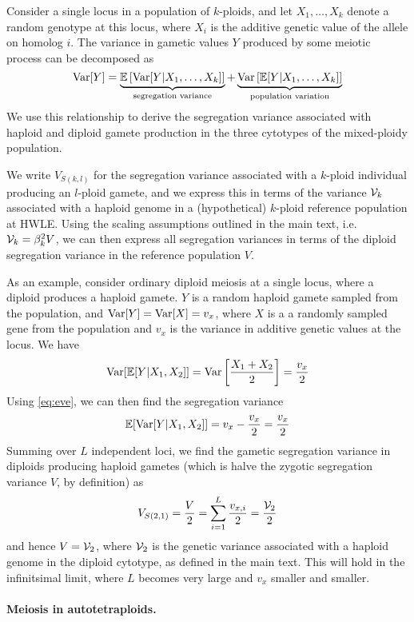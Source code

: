\documentclass[11pt,a4paper]{article}
\begin{document}
Consider a single locus in a population of $k$-ploids, and let $X_1,\dots,X_k$
denote a random genotype at this locus, where $X_i$ is the additive genetic
value of the allele on homolog $i$.
The variance in gametic values $Y$ produced by some meiotic process can be
decomposed as 
\begin{equation}
  \mathrm{Var}[Y] = \underbrace{\mathbb{E}\left[\mathrm{Var}[Y|X_1, \dots, X_k]\right]}_{\text{segregation variance}} 
    + \underbrace{\mathrm{Var}\left[\mathbb{E}[Y|X_1, \dots, X_k]\right]}_{\text{population
variation}}
\label{eq:eve}
\end{equation}
We use this relationship to derive the segregation variance associated with
haploid and diploid gamete production in the three cytotypes of the
mixed-ploidy population.

We write $V_{S(k,l)}$ for the segregation variance associated with a
$k$-ploid individual producing an $l$-ploid gamete, and we express this in
terms of the variance $\mathcal{V}_{k}$ associated with a haploid genome in a
(hypothetical) $k$-ploid reference population at HWLE.
Using the scaling assumptions outlined in the main text, i.e. $\mathcal{V}_{k} =
\beta_k^2 V$, we can then express all segregation variances in terms of the
diploid segregation variance in the reference population $V$.

As an example, consider ordinary diploid meiosis at a single locus, where a
diploid produces a haploid gamete. $Y$ is a random haploid gamete sampled from the
population, and $\mathrm{Var}[Y] = \mathrm{Var}[X] = v_x$, where $X$ is a a randomly sampled
gene from the population and $v_x$ is the variance in additive genetic values
at the locus.
We have
  $$\mathrm{Var}[\mathbb{E}[Y|X_1,X_2]] = \mathrm{Var}\left[\frac{X_1 + X_2}{2}\right] = \frac{v_x}{2}$$
Using \cref{eq:eve}, we can then find the segregation variance
  $$\mathbb{E}[\mathrm{Var}[Y|X_1,X_2]] = v_x - \frac{v_x}{2} = \frac{v_x}{2}$$
Summing over $L$ independent loci, we find the gametic segregation variance in
diploids producing haploid gametes (which is halve the zygotic segregation
variance $V$, by definition) as
  $$V_{S(2,1)} = \frac{V}{2} = \sum_{i=1}^L \frac{v_{x,i}}{2} = \frac{\mathcal{V}_{2}}{2}$$
and hence $V=\mathcal{V}_{2}$, where $\mathcal{V}_{2}$ is the genetic variance associated with
a haploid genome in the diploid cytotype, as defined in the main text.
This will hold in the infinitsimal limit, where $L$ becomes very large and
$v_x$ smaller and smaller.


\paragraph{Meiosis in autotetraploids.}
\end{document}
